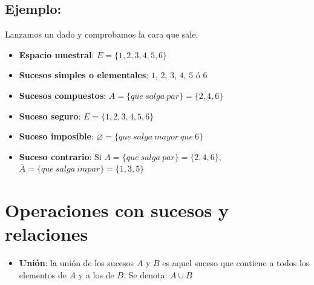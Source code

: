 \documentclass[a4paper,spanish,9pt]{extarticle}
\begin{document}
\begin{multicols*}{2}
\subsection{Ejemplo:} Lanzamos un dado y comprobamos la cara que sale.
\begin{itemize}
\item \textbf{Espacio muestral}: $E=\lbrace 1,2,3,4,5,6 \rbrace $
\item \textbf{Sucesos simples o elementales}: $1$, $2$, $3$, $4$, $5$ ó $6$
\item \textbf{Sucesos compuestos}: $A=\lbrace que\ salga\ par\rbrace=\lbrace2,4,6\rbrace$
\item \textbf{Suceso seguro}: $E=\lbrace 1,2,3,4,5,6 \rbrace $
\item \textbf{Suceso imposible}: $\varnothing=\lbrace que\ salga \ mayor \ que \ 6\rbrace$
\item \textbf{Suceso contrario}: Si $A=\lbrace que\ salga\ par\rbrace=\lbrace2,4,6\rbrace$, $\overline{A}=\lbrace que\ salga\ impar\rbrace=\lbrace1,3,5\rbrace$ 
\end{itemize}


\section{Operaciones con sucesos y relaciones}

\def\firstcircle{(0,0) circle (1.5cm)}
\def\secondcircle{(0:2cm) circle (1.5cm)}
\def\espacio{(-2,-2) rectangle (4,2)}



\setlength{\parskip}{5mm}
\begin{itemize}
\item \textbf{Unión}: la unión de los sucesos $A$ y $B$ es aquel suceso que contiene a todos los elementos de $A$ y a  los de $B$. Se denota: $A\cup B$ 



\end{itemize}
\end{multicols*}
\end{document}

